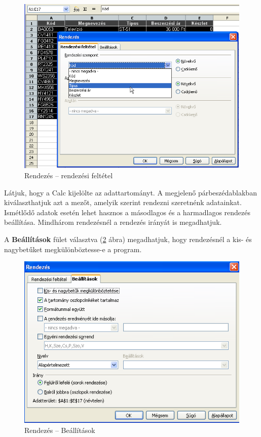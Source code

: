 \begin{figure}[!h]
\begin{center}
\includegraphics[width=15.999cm]{oocalcv2-img112.png}
\caption{Rendezés -- rendezési feltétel}\label{RendezésiFeltétel}
\end{center}
\end{figure}

Látjuk, hogy a Calc kijelölte az adattartományt. A megjelenő
párbeszédablakban kiválaszthatjuk azt a mezőt, amelyik
szerint rendezni szeretnénk adatainkat. Ismétlődő adatok
esetén lehet hasznos a másodlagos és a harmadlagos rendezés
beállítása. Mindhárom rendezésnél a rendezés irányát
is megadhatjuk.

A \textbf{Beállítások} fület választva (\ref{RendezésBeállítások} ábra)
megadhatjuk, hogy rendezésnél a kis- és nagybetűket
megkülönböztesse-e a program.

\begin{figure}[!h]
\begin{center}
\includegraphics[width=12.864cm]{oocalcv2-img113.png}
\caption{Rendezés --  Beállítások}\label{RendezésBeállítások}
\end{center}
\end{figure}

